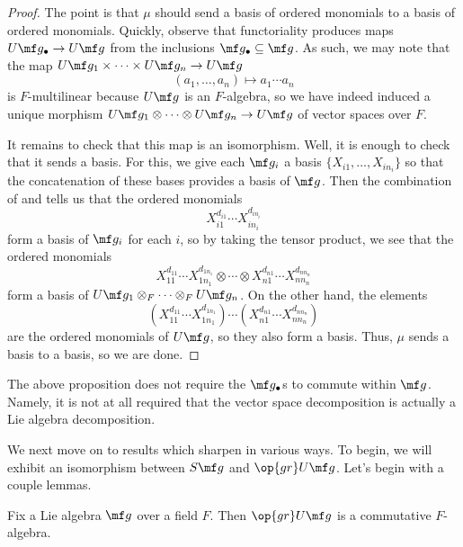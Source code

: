 \documentclass[../notes.tex]{subfiles}
\begin{document}
\begin{proof}
	The point is that $\mu$ should send a basis of ordered monomials to a basis of ordered monomials. Quickly, observe that functoriality produces maps $U\mf g_\bullet\to U\mf g$ from the inclusions $\mf g_\bullet\subseteq\mf g$. As such, we may note that the map $U\mf g_1\times\cdots\times U\mf g_n\to U\mf g$
	\[(a_1,\ldots,a_n)\mapsto a_1\cdots a_n\]
	is $F$-multilinear because $U\mf g$ is an $F$-algebra, so we have indeed induced a unique morphism $U\mf g_1\otimes\cdots\otimes U\mf g_n\to U\mf g$ of vector spaces over $F$.

	It remains to check that this map is an isomorphism. Well, it is enough to check that it sends a basis. For this, we give each $\mf g_i$ a basis $\{X_{i1},\ldots,X_{in_i}\}$ so that the concatenation of these bases provides a basis of $\mf g$. Then the combination of  and  tells us that the ordered monomials
	\[X_{i1}^{d_{i1}}\cdots X_{in_i}^{d_{in_i}}\]
	form a basis of $\mf g_i$ for each $i$, so by taking the tensor product, we see that the ordered monomials
	\[X_{11}^{d_{11}}\cdots X_{1n_1}^{d_{1n_1}}\otimes\cdots\otimes X_{n1}^{d_{n1}}\cdots X_{nn_n}^{d_{nn_n}}\]
	form a basis of $U\mf g_1\otimes_F\cdots\otimes_F U\mf g_n$. On the other hand, the elements
	\[\left(X_{11}^{d_{11}}\cdots X_{1n_1}^{d_{1n_1}}\right)\cdots\left(X_{n1}^{d_{n1}}\cdots X_{nn_n}^{d_{nn_n}}\right)\]
	are the ordered monomials of $U\mf g$, so they also form a basis. Thus, $\mu$ sends a basis to a basis, so we are done.
\end{proof}
\begin{remark}
	The above proposition does not require the $\mf g_\bullet$s to commute within $\mf g$. Namely, it is not at all required that the vector space decomposition is actually a Lie algebra decomposition.
\end{remark}
We next move on to results which sharpen  in various ways. To begin, we will exhibit an isomorphism between $S\mf g$ and $\op{gr}U\mf g$. Let's begin with a couple lemmas.
\begin{lemma} \label{lem:gr-ug-commutative}
	Fix a Lie algebra $\mf g$ over a field $F$. Then $\op{gr}U\mf g$ is a commutative $F$-algebra.
\end{lemma}
\end{document}
